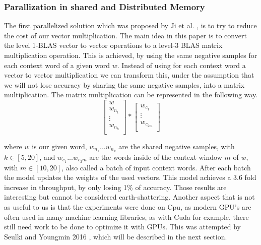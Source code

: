 \subsubsection{Parallization in shared and Distributed Memory}
The first parallelized solution which was proposed by Ji et al. \cite{intel}, is to try to reduce the cost of our vector multiplication. The main idea in this paper is to convert the level 1-BLAS vector to vector operations to a level-3 BLAS matrix multiplication operation. This is achieved, by using the same negative samples for each context word of a given word $w$. Instead of using for each context word a vector to vector multiplication we can transform this, under the assumption that we will not lose accuracy by sharing the same negative samples,  into a matrix multiplication. The matrix multiplication can be represented in the following way.
\[
\begin{bmatrix}
w \\
w_{n_1}  \\
\vdots \\
w_{n_k}\\
\end{bmatrix}
*
\begin{bmatrix}
w_{c_1}\\
\vdots\\
w_{c_{2m}}\\
\end{bmatrix}
\]

where $w$ is our given word, $w_{n_1}...w_{n_k}$ are the shared negative samples, with $k \in [5,20]$, and $w_{c_1}...w_{c_2m}$ are the words inside of the context window $m$ of $w$, with $m \in [10,20]$, also called a batch of input context words. After each batch the model updates the weights of the used vectors. 
This model achieves a 3.6 fold increase in throughput, by only losing 1\% of accuracy.  Those results are interesting but cannot be considered earth-shattering. Another aspect that is not as useful to us is that the experiments were done on Cpu, as modern GPU's are often used in many machine learning libraries, as with Cuda for example, there still need work to be done to optimize it with GPUs. This was attempted by Seulki and Youngmin 2016 \cite{gpu}, which will be described in the next section.


